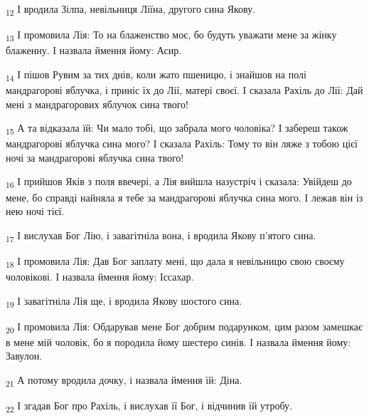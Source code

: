 \begin{tcolorbox}
\textsubscript{12} І вродила Зілпа, невільниця Ліїна, другого сина Якову.
\end{tcolorbox}
\begin{tcolorbox}
\textsubscript{13} І промовила Лія: То на блаженство моє, бо будуть уважати мене за жінку блаженну. І назвала ймення йому: Асир.
\end{tcolorbox}
\begin{tcolorbox}
\textsubscript{14} І пішов Рувим за тих днів, коли жато пшеницю, і знайшов на полі мандрагорові яблучка, і приніс їх до Лії, матері своєї. І сказала Рахіль до Лії: Дай мені з мандрагорових яблучок сина твого!
\end{tcolorbox}
\begin{tcolorbox}
\textsubscript{15} А та відказала їй: Чи мало тобі, що забрала мого чоловіка? І забереш також мандрагорові яблучка сина мого? І сказала Рахіль: Тому то він ляже з тобою цієї ночі за мандрагорові яблучка сина твого!
\end{tcolorbox}
\begin{tcolorbox}
\textsubscript{16} І прийшов Яків з поля ввечері, а Лія вийшла назустріч і сказала: Увійдеш до мене, бо справді найняла я тебе за мандрагорові яблучка сина мого. І лежав він із нею ночі тієї.
\end{tcolorbox}
\begin{tcolorbox}
\textsubscript{17} І вислухав Бог Лію, і завагітніла вона, і вродила Якову п'ятого сина.
\end{tcolorbox}
\begin{tcolorbox}
\textsubscript{18} І промовила Лія: Дав Бог заплату мені, що дала я невільницю свою своєму чоловікові. І назвала ймення йому: Іссахар.
\end{tcolorbox}
\begin{tcolorbox}
\textsubscript{19} І завагітніла Лія ще, і вродила Якову шостого сина.
\end{tcolorbox}
\begin{tcolorbox}
\textsubscript{20} І промовила Лія: Обдарував мене Бог добрим подарунком, цим разом замешкає в мене мій чоловік, бо я породила йому шестеро синів. І назвала ймення йому: Завулон.
\end{tcolorbox}
\begin{tcolorbox}
\textsubscript{21} А потому вродила дочку, і назвала ймення їй: Діна.
\end{tcolorbox}
\begin{tcolorbox}
\textsubscript{22} І згадав Бог про Рахіль, і вислухав її Бог, і відчинив їй утробу.
\end{tcolorbox}
